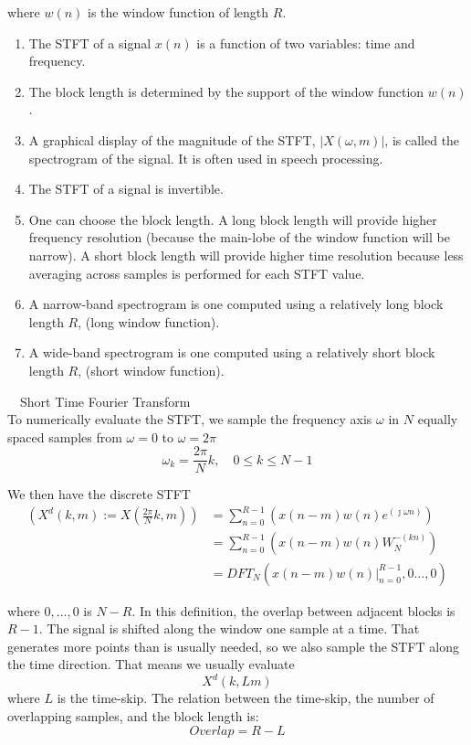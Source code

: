 \documentclass[10pt,english]{article}
\begin{document}
where $w(n)$ is the window function of length $R$. 
\begin{enumerate}
\item The STFT of a signal $x(n)$ is a function of two variables: time and frequency.
\item The block length is determined by the support of the window function $w (n)$.
\item A graphical display of the magnitude of the STFT, $\left| X(\omega, m)\right| $, is called the spectrogram of the signal. It is often used in speech processing.
\item The STFT of a signal is invertible.
\item One can choose the block length. A long block length will provide higher frequency resolution (because the main-lobe of the window function will be narrow). A short block length will provide higher time resolution because less averaging across samples is performed for each STFT value.
\item A narrow-band spectrogram is one computed using a relatively long block length $R$, (long window function).
\item A wide-band spectrogram is one computed using a relatively short block length $R$, (short window function).
\end{enumerate}


\ \textbullet \  Short Time Fourier Transform\\
To numerically evaluate the STFT, we sample the frequency axis $\omega$ in $N$ equally spaced samples from $\omega = 0$ to $\omega = 2 \pi$
\begin{equation}
\omega_k = \frac{2 \pi}{N} k, \quad 0 \leq k \leq N-1
\end{equation}

We then have the discrete STFT
\begin{equation}
\begin{split}
\left( X^d(k,m):= X \left( \frac{2 \pi }{N} k,m \right) \right) &=  \sum_{n = 0}^{R-1} \left( x(n-m)w(n) e^{(\jmath \omega n)} \right) \\
&=  \sum_{n = 0}^{R-1} \left( x(n-m)w(n) W_N^{-(kn)} \right)\\
&= DFT_N \left( x(n-m)w(n) |_{n = 0}^{R-1}, 0 \dots, 0 \right)
\end{split}
\end{equation}

where $0, \dots, 0 $ is $N-R$. In this definition, the overlap between adjacent blocks is $R - 1$. The signal is shifted along the window one sample at a time. That generates more points than is usually needed, so we also sample the STFT along the time direction. That means we usually evaluate
\begin{equation}
X^d \left( k, Lm \right)
\end{equation}
where $L$ is the time-skip. The relation between the time-skip, the number of overlapping samples, and the block length is:
\begin{equation}
Overlap = R-L
\end{equation}
\end{document}
